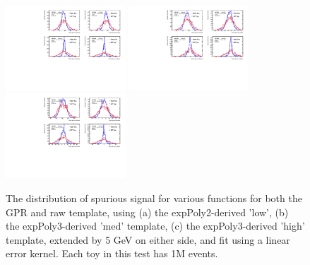 \begin{figure} 
\begin{center}
  \includegraphics[width=0.4\textwidth]{figures/background/gpr/validation/linear/ToyTest_FitSigVals_lowpT_1M_noSig}   
  \includegraphics[width=0.4\textwidth]{figures/background/gpr/validation/linear/ToyTest_FitSigVals_medpT_1M_noSig}   
  \includegraphics[width=0.4\textwidth]{figures/background/gpr/validation/linear/ToyTest_FitSigVals_highpT_1M_noSig}   
\caption{The distribution of spurious signal for various functions for both the GPR and raw template, using (a) the expPoly2-derived 'low', (b) the expPoly3-derived 'med' template, (c) the expPoly3-derived 'high' template, extended by 5 GeV on either side, and fit using a linear error kernel. Each toy in this test has 1M events.}
\label{fig:linearkernel_lowpt_1M_noSig}
\end{center}
\end{figure}

